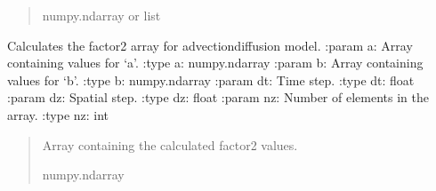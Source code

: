 \documentclass[a4paper,11pt,english,openany]{sphinxmanual}
\begin{document}
\begin{fulllineitems}
\begin{fulllineitems}
\begin{quote}
\begin{description}
\begin{description}
\end{description}


\sphinxAtStartPar
numpy.ndarray or list

\end{description}\end{quote}

\end{fulllineitems}


\begin{fulllineitems}
\label{\detokenize{api/spyice.models.advection_diffusion:src.spyice.models.advection_diffusion.AdvectionDiffusion.factor_2}}
\pysigstartsignatures
\pysiglinewithargsret
{}
{\sphinxparamcomma {}\sphinxparamcomma {}\sphinxparamcomma {}\sphinxparamcomma {}}
{}
\pysigstopsignatures
\sphinxAtStartPar
Calculates the factor2 array for advection\sphinxhyphen{}diffusion model.
:param a: Array containing values for ‘a’.
:type a: numpy.ndarray
:param b: Array containing values for ‘b’.
:type b: numpy.ndarray
:param dt: Time step.
:type dt: float
:param dz: Spatial step.
:type dz: float
:param nz: Number of elements in the array.
:type nz: int
\begin{quote}\begin{description}
\sphinxAtStartPar
Array containing the calculated factor2 values.

\sphinxAtStartPar
numpy.ndarray

\end{description}\end{quote}

\end{fulllineitems}



\end{fulllineitems}
\end{document}
